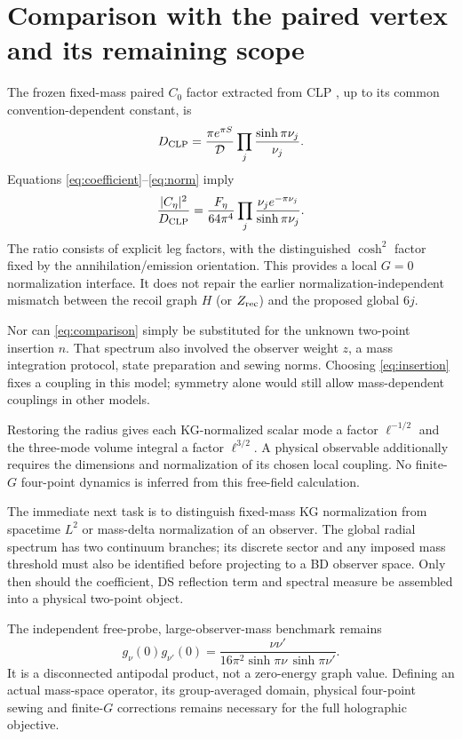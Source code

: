 \documentclass[11pt,a4paper]{article}
\newcommand{\cD}{\mathcal D}
\begin{document}
\newpage
\section{Comparison with the paired vertex and its remaining scope}
The frozen fixed-mass paired $C_0$ factor extracted from CLP
\cite{clp}, up to its common convention-dependent constant, is
\begin{equation}
 D_{\rm CLP}=\frac{\pi e^{\pi S}}{\cD}
             \prod_j\frac{\sinh\pi\nu_j}{\nu_j}.
\end{equation}
Equations \eqref{eq:coefficient}--\eqref{eq:norm} imply
\begin{equation}
 \frac{|C_\eta|^2}{D_{\rm CLP}}
 =\frac{F_\eta}{64\pi^4}
       \prod_j\frac{\nu_j e^{-\pi\nu_j}}{\sinh\pi\nu_j}.
 \label{eq:comparison}
\end{equation}
The ratio consists of explicit leg factors, with the distinguished
$\cosh^2$ factor fixed by the annihilation/emission orientation.
This provides a local $G=0$ normalization interface. It does not
repair the earlier normalization-independent mismatch between the
recoil graph $H$ (or $Z_{\rm rec}$) and the proposed global $6j$.

Nor can \eqref{eq:comparison} simply be substituted for the unknown
two-point insertion $n$. That spectrum also involved the observer
weight $z$, a mass integration protocol, state preparation and
sewing norms. Choosing \eqref{eq:insertion} fixes a coupling in
this model; symmetry alone would still allow mass-dependent
couplings in other models.

Restoring the radius gives each KG-normalized scalar mode a factor
$\ell^{-1/2}$ and the three-mode volume integral a factor
$\ell^{3/2}$. A physical observable additionally requires the
dimensions and normalization of its chosen local coupling.
No finite-$G$ four-point dynamics is inferred from this free-field
calculation.

The immediate next task is to distinguish fixed-mass KG
normalization from spacetime $L^2$ or mass-delta normalization
of an observer. The global radial spectrum has two continuum
branches; its discrete sector and any imposed mass threshold must
also be identified before projecting to a BD observer space.
Only then should the coefficient, DS reflection term and spectral
measure be assembled into a physical two-point object.

The independent free-probe, large-observer-mass benchmark remains
\begin{equation}
 g_\nu(0)g_{\nu'}(0)=
 \frac{\nu\nu'}{16\pi^2\sinh\pi\nu\,\sinh\pi\nu'}.
\end{equation}
It is a disconnected antipodal product, not a zero-energy graph
value. Defining an actual mass-space operator, its group-averaged
domain, physical four-point sewing and finite-$G$ corrections
remains necessary for the full holographic objective.
\end{document}
